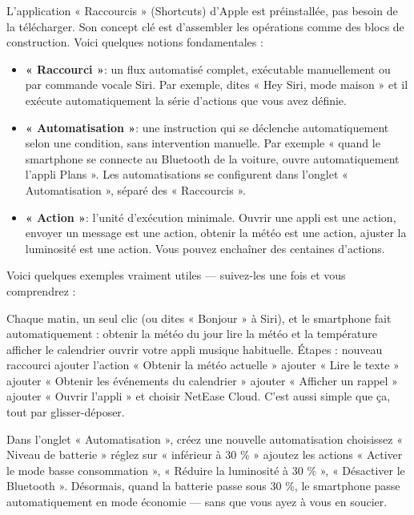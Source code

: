 
L'application « Raccourcis » (Shortcuts) d'Apple est préinstallée, pas besoin de la télécharger. Son concept clé est d'assembler les opérations comme des blocs de construction. Voici quelques notions fondamentales :

\begin{itemize}
  \item \textbf{« Raccourci »}: un flux automatisé complet, exécutable manuellement ou par commande vocale Siri. Par exemple, dites « Hey Siri, mode maison » et il exécute automatiquement la série d’actions que vous avez définie.
  \item \textbf{« Automatisation »}: une instruction qui se déclenche automatiquement selon une condition, sans intervention manuelle. Par exemple « quand le smartphone se connecte au Bluetooth de la voiture, ouvre automatiquement l’appli Plans ». Les automatisations se configurent dans l’onglet « Automatisation », séparé des « Raccourcis ».
  \item \textbf{« Action »}: l’unité d’exécution minimale. Ouvrir une appli est une action, envoyer un message est une action, obtenir la météo est une action, ajuster la luminosité est une action. Vous pouvez enchaîner des centaines d’actions.
\end{itemize}

Voici quelques exemples vraiment utiles — suivez-les une fois et vous comprendrez :


Chaque matin, un seul clic (ou dites « Bonjour » à Siri), et le smartphone fait automatiquement : obtenir la météo du jour lire la météo et la température afficher le calendrier ouvrir votre appli musique habituelle. Étapes : nouveau raccourci ajouter l'action « Obtenir la météo actuelle » ajouter « Lire le texte » ajouter « Obtenir les événements du calendrier » ajouter « Afficher un rappel » ajouter « Ouvrir l'appli » et choisir NetEase Cloud. C'est aussi simple que ça, tout par glisser-déposer.


Dans l'onglet « Automatisation », créez une nouvelle automatisation choisissez « Niveau de batterie » réglez sur « inférieur à 30 \% » ajoutez les actions « Activer le mode basse consommation », « Réduire la luminosité à 30 \% », « Désactiver le Bluetooth ». Désormais, quand la batterie passe sous 30 \%, le smartphone passe automatiquement en mode économie — sans que vous ayez à vous en soucier.

